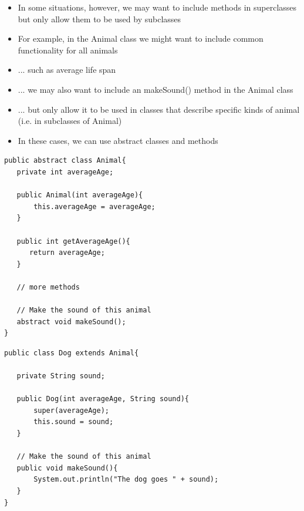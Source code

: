 \documentclass{beamer}
\begin{document}
\begin{frame}
\begin{itemize}
\item In some situations, however, we may want to include methods in superclasses but only allow them to be used by subclasses
\item For example, in the Animal class we might want to include common functionality for all animals 
\item ... such as average life span
\end{itemize}
\end{frame}

\begin{frame}[fragile]
\begin{itemize}
\item ... we may also want to include an makeSound() method in the Animal class 
\item ... but only allow it to be used in classes that describe specific kinds of animal (i.e. in subclasses of Animal)
\bigskip
\item In these cases, we can use abstract classes and methods
\end{itemize}
\end{frame}

\begin{frame}[fragile]
\begin{block}{}
\begin{lstlisting}
public abstract class Animal{
   private int averageAge;
   
   public Animal(int averageAge){
       this.averageAge = averageAge;
   }

   public int getAverageAge(){
      return averageAge;
   }
   
   // more methods 
   
   // Make the sound of this animal
   abstract void makeSound();  
}
\end{lstlisting}
\end{block}
\end{frame}

\begin{frame}[fragile]
\begin{block}{}
\begin{lstlisting}
public class Dog extends Animal{

   private String sound;
   
   public Dog(int averageAge, String sound){
       super(averageAge);
       this.sound = sound;
   }
   
   // Make the sound of this animal
   public void makeSound(){
       System.out.println("The dog goes " + sound);
   }  
}
\end{lstlisting}
\end{block}
\end{frame}
\end{document}
